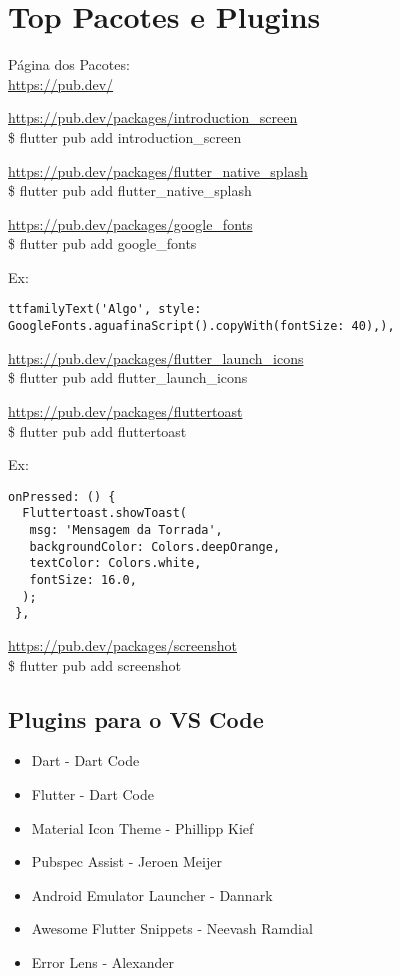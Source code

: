 \documentclass[11pt]{scrartcl}
\begin{document}
\section{Top Pacotes e Plugins}

Página dos Pacotes:
\\
\url{https://pub.dev/}

\url{https://pub.dev/packages/introduction_screen} \\
{\ttfamily\$ flutter pub add introduction\_screen}

\url{https://pub.dev/packages/flutter_native_splash} \\
{\ttfamily\$ flutter pub add flutter\_native\_splash}

\url{https://pub.dev/packages/google_fonts} \\
{\ttfamily\$ flutter pub add google\_fonts}

Ex: 
\begin{lstlisting}[]
 ttfamilyText('Algo', style: GoogleFonts.aguafinaScript().copyWith(fontSize: 40),),
\end{lstlisting}

\url{https://pub.dev/packages/flutter_launch_icons} \\
{\ttfamily\$ flutter pub add flutter\_launch\_icons}

\url{https://pub.dev/packages/fluttertoast} \\
{\ttfamily\$ flutter pub add fluttertoast} 

Ex:
\begin{lstlisting}[]
 onPressed: () {
  Fluttertoast.showToast(
   msg: 'Mensagem da Torrada',
   backgroundColor: Colors.deepOrange,
   textColor: Colors.white,
   fontSize: 16.0,
  );
 },
\end{lstlisting}

\url{https://pub.dev/packages/screenshot} \\
{\ttfamily\$ flutter pub add screenshot}

\subsection{Plugins para o VS Code}
\begin{itemize}[nolistsep]
	\item Dart - Dart Code
	\item Flutter - Dart Code
	\item Material Icon Theme - Phillipp Kief
	\item Pubspec Assist - Jeroen Meijer
	\item Android Emulator Launcher - Dannark
	\item Awesome Flutter Snippets - Neevash Ramdial
	\item Error Lens - Alexander
\end{itemize}
\end{document}

